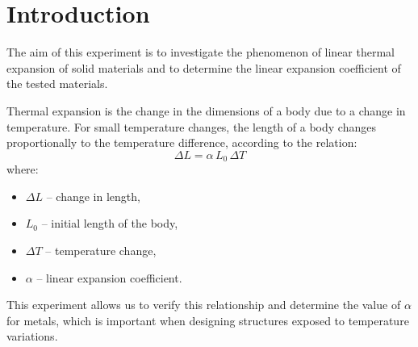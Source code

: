 \section{Introduction}

The aim of this experiment is to investigate the phenomenon of linear thermal expansion of solid materials and to determine the linear expansion coefficient of the tested materials.

Thermal expansion is the change in the dimensions of a body due to a change in temperature. For small temperature changes, the length of a body changes proportionally to the temperature difference, according to the relation:
\begin{equation}
    \Delta L = \alpha \, L_0 \, \Delta T
\end{equation}
where:
\begin{itemize}
    \item $\Delta L$ – change in length,
    \item $L_0$ – initial length of the body,
    \item $\Delta T$ – temperature change,
    \item $\alpha$ – linear expansion coefficient.
\end{itemize}

This experiment allows us to verify this relationship and determine the value of $\alpha$ for metals, which is important when designing structures exposed to temperature variations.

